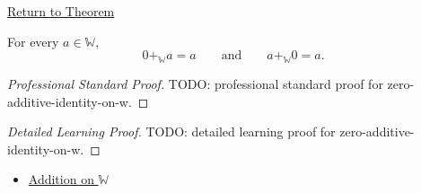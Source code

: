 \newpage
{}
\label{prf:zero-additive-identity-on-w}

\begin{remark*}[Return]
\hyperref[thm:zero-additive-identity-on-w]{Return to Theorem}
\end{remark*}

\begin{theorem*}
For every $a\in\mathbb{W}$,
\[
0+_{\mathbb{W}}a=a
\qquad\text{and}\qquad
a+_{\mathbb{W}}0=a.
\]
\end{theorem*}

\begin{proof}[Professional Standard Proof]
\LRAProofBodyStart
TODO: professional standard proof for zero-additive-identity-on-w.
\end{proof}

\begin{proof}[Detailed Learning Proof]
\LRAProofBodyStart
TODO: detailed learning proof for zero-additive-identity-on-w.
\end{proof}

\begin{remark*}
\end{remark*}

\begin{dependencies}
\begin{itemize}
  \item \hyperref[def:addition-on-w]{Addition on $\mathbb{W}$}
\end{itemize}
\end{dependencies}

\clearpage
